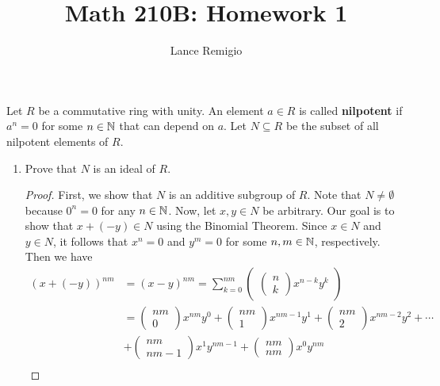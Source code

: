 \documentclass[a4paper]{article}
\title{Math 210B: Homework 1}
\author{Lance Remigio}
\begin{document}
\maketitle

\begin{problem}
   Let \( R  \) be a commutative ring with unity. An element \( a \in R  \) is called \textbf{nilpotent} if \( a^{n} = 0  \) for some \( n \in \mathbb{N}  \) that can depend on \( a  \). Let \( N \subseteq  R \) be the subset of all nilpotent elements of \( R  \). 
   \begin{enumerate}
       \item[(a)] Prove that \(  N \) is an ideal of \( R  \).
           \begin{proof}
           First, we show that \( N  \) is an additive subgroup of \( R  \). Note that \( N \neq \emptyset  \) because \( 0^{n} = 0  \) for any \( n \in \mathbb{N} \). Now, let \( x,y \in N  \) be arbitrary. Our goal is to show that \( x + (-y) \in N \) using the Binomial Theorem. Since \( x \in N  \) and \( y \in N  \), it follows that \( x^{n} = 0  \) and \( y^{m} = 0  \) for some \( n,m \in \mathbb{N} \), respectively. Then we have
           \begin{align*}
               (x + (-y))^{nm} &= (x - y)^{nm} = \sum_{ k =0  }^{ nm } \begin{pmatrix} \begin{pmatrix} n \\ k  \end{pmatrix}  x^{n-k} y^{k} \end{pmatrix}  \\
                                              &= \begin{pmatrix} nm \\ 0  \end{pmatrix}  x^{nm} y^{0} + \begin{pmatrix} nm \\ 1  \end{pmatrix}  x^{nm - 1} y^{1} + \begin{pmatrix} nm  \\ 2  \end{pmatrix}  x^{nm - 2} y^{2} + \cdots \\  
                                              &+ \begin{pmatrix} nm \\ nm - 1  \end{pmatrix} x^{1} y^{nm -1} + \begin{pmatrix} nm \\ nm \end{pmatrix}  x^{0} y^{nm} \\

\end{align*}
\end{proof}
\end{enumerate}
\end{problem}
\end{document}
